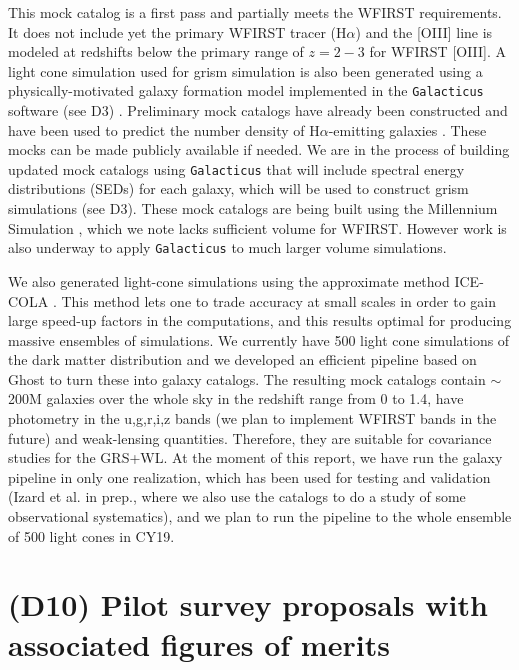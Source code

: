 This mock catalog is a first pass and partially meets the WFIRST requirements.
It does not include yet the primary WFIRST tracer (H$\alpha$) and the [OIII] line
is modeled at redshifts below the primary range of $z=2-3$ for WFIRST [OIII]. A
light cone simulation used for grism simulation is also been generated using a
physically-motivated galaxy formation model implemented in the
\texttt{Galacticus} software (see D3) \citep{Benson2010}. Preliminary mock
catalogs have already been constructed and have been used to predict the number
density of H$\alpha$-emitting galaxies \citep{Merson2018}. These mocks can be
made publicly available if needed. We are in the process of building updated
mock catalogs using \texttt{Galacticus} that will include spectral energy
distributions (SEDs) for each galaxy, which will be used to construct grism
simulations (see D3). These mock catalogs are being built using the Millennium
Simulation \citep{Springel05}, which we note lacks sufficient volume for WFIRST.
However work is also underway to apply \texttt{Galacticus} to much larger volume
simulations.

We also generated light-cone simulations using the approximate method ICE-COLA \citep{Izard2016,Izard2018}. This method lets one to trade accuracy at small scales in order to gain large speed-up factors in the computations, and this results optimal for producing massive ensembles of simulations. We currently have 500 light cone simulations of the dark matter distribution and we developed an efficient pipeline based on Ghost \citep{Bull2017} to turn these into galaxy catalogs. The resulting mock catalogs contain $\sim$ 200M galaxies over the whole sky in the redshift range from 0 to 1.4, have photometry in the u,g,r,i,z  bands (we plan to implement WFIRST bands in the future) and weak-lensing quantities. Therefore, they are suitable for covariance studies for the GRS+WL. At the moment of this report, we have run the galaxy pipeline in only one realization, which has been used for testing and validation (Izard et al. in prep., where we also use the catalogs to do a study of some observational systematics), and we plan to run the pipeline to the whole ensemble of 500 light cones in CY19.

\section*{(D10) Pilot survey proposals with associated figures of merits}

